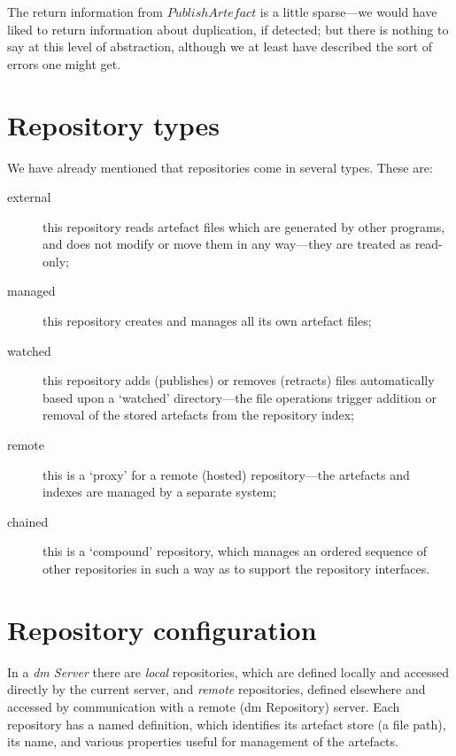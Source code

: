 \documentclass[a4paper,titlepage,twoside,12pt]{article}
\begin{document}
The return information from $PublishArtefact$ is a little sparse---we would have liked to return information about duplication, if detected; but there is nothing to say at this level of abstraction, although we at least have described the sort of errors one might get.



\section{Repository types}
We have already mentioned that repositories come in several types. These are:
\begin{description}
\item[external] this repository reads artefact files which are generated by other programs, and does not 
modify or move them in any way---they are treated as read-only; 
\item[managed] this repository creates and manages all its own artefact files;
\item[watched] this repository adds (publishes) or removes (retracts) files automatically based upon a `watched' directory---the file operations trigger addition or removal of the stored artefacts from the repository index;
\item[remote] this is a `proxy' for a remote (hosted) repository---the artefacts and indexes are managed by a separate system;
\item[chained] this is a `compound' repository, which manages an ordered sequence of other repositories in such a way as to support the repository interfaces.
\end{description}




\section{Repository configuration}
In  a \emph{dm Server} there are \emph{local} repositories, which are defined locally and accessed directly by the current server, and \emph{remote} repositories, defined elsewhere and accessed by communication with a remote (dm Repository) server. Each repository has a named definition, which identifies its artefact store (a file path), its name, and various properties useful for management of the artefacts.
\end{document}
